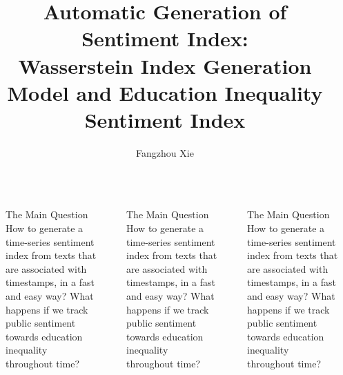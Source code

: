 \documentclass[final, notheorems]{beamer}
\title{Automatic Generation of Sentiment Index:\\
Wasserstein Index Generation Model and Education Inequality Sentiment Index}
\author{Fangzhou Xie}
\institute[NYU]{Department of Economics, New York University}
\newlength{\sepwid}
\newlength{\onecolwid}
\begin{document}

\begin{frame}[t]
	\begin{columns}[t]
		\begin{column}{\sepwid}\end{column}			%
		\begin{column}{\onecolwid}
			\begin{alertblock}{The Main Question}
				How to generate a time-series sentiment index from texts that are
				associated with timestamps, in a fast and easy way?
				What happens if we track public sentiment towards education inequality
				throughout time?
			\end{alertblock}
		\end{column}

		\begin{column}{\sepwid}\end{column}			%
		\begin{column}{\onecolwid}
			\begin{alertblock}{The Main Question}
				How to generate a time-series sentiment index from texts that are
				associated with timestamps, in a fast and easy way?
				What happens if we track public sentiment towards education inequality
				throughout time?
			\end{alertblock}
		\end{column}

		\begin{column}{\sepwid}\end{column}			%
		\begin{column}{\onecolwid}
			\begin{alertblock}{The Main Question}
				How to generate a time-series sentiment index from texts that are
				associated with timestamps, in a fast and easy way?
				What happens if we track public sentiment towards education inequality
				throughout time?
			\end{alertblock}
		\end{column}


\end{columns}
\end{frame}
\end{document}
